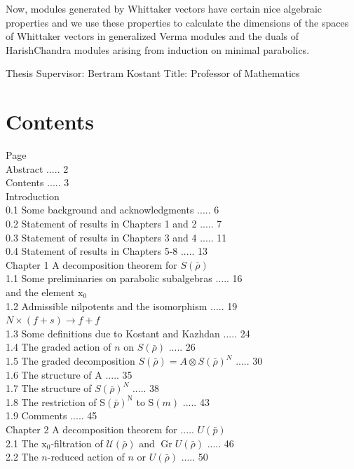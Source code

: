 \documentclass[10pt]{article}
\begin{document}
Now, modules generated by Whittaker vectors have certain nice algebraic properties and we use these properties to calculate the dimensions of the spaces of Whittaker vectors in generalized Verma modules and the duals of HarishChandra modules arising from induction on minimal parabolics.

Thesis Supervisor: Bertram Kostant Title: Professor of Mathematics

\section{Contents}
Page\\
Abstract ..... 2\\
Contents ..... 3\\
Introduction\\
0.1 Some background and acknowledgments ..... 6\\
0.2 Statement of results in Chapters 1 and 2 ..... 7\\
0.3 Statement of results in Chapters 3 and 4 ..... 11\\
0.4 Statement of results in Chapters 5-8 ..... 13\\
Chapter 1 A decomposition theorem for $S(\bar{\rho})$\\
1.1 Some preliminaries on parabolic subalgebras ..... 16\\
and the element $\mathrm{x}_{0}$\\
1.2 Admissible nilpotents and the isomorphism ..... 19\\
$N \times(f+s) \rightarrow f+f$\\
1.3 Some definitions due to Kostant and Kazhdan ..... 24\\
1.4 The graded action of $n$ on $S(\bar{\rho})$ ..... 26\\
1.5 The graded decomposition $S(\bar{\rho})=A \otimes S(\bar{\rho})^{N}$ ..... 30\\
1.6 The structure of A ..... 35\\
1.7 The structure of $S(\bar{\rho})^{N}$ ..... 38\\
1.8 The restriction of $\mathrm{S}(\bar{p})^{\mathrm{N}}$ to $\mathrm{S}(m)$ ..... 43\\
1.9 Comments ..... 45\\
Chapter 2 A decomposition theorem for ..... $U(\bar{p})$\\
2.1 The $\mathrm{x}_{0}$-filtration of $\mathcal{U}(\bar{\rho})$ and $\operatorname{Gr} U(\bar{\rho})$ ..... 46\\
2.2 The $n$-reduced action of $n$ or $U(\bar{\rho})$ ..... 50\\
\end{document}
